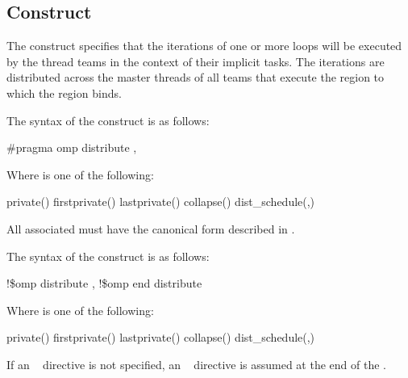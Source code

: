 {{{{\subsection{ Construct}
\label{subsec:distribute Construct}
\summary
The  construct specifies that the iterations of one or more loops will be 
executed by the thread teams in the context of their implicit tasks. The iterations are 
distributed across the master threads of all teams that execute the  region to 
which the  region binds.

\syntax
\ccppspecificstart
The syntax of the  construct is as follows:

\begin{boxedcode}
\#pragma omp distribute \plc{[clause[ [},\plc{] clause] ... ] new-line}
\end{boxedcode}

Where  is one of the following:

\begin{indentedcodelist}
private()
firstprivate()
lastprivate()
collapse()
dist\_schedule(\plc{kind[},\plc{ chunk\_size]})
\end{indentedcodelist}

All associated  must have the canonical form described in 
.
\ccppspecificend
\bigskip

\fortranspecificstart
The syntax of the  construct is as follows:

\begin{boxedcode}
!\$omp distribute \plc{[clause[ [},\plc{] clause] ... ]}
\plc{[}!\$omp end distribute\plc{]}
\end{boxedcode}

Where  is one of the following:

\begin{indentedcodelist}
private()
firstprivate()
lastprivate()
collapse()
dist\_schedule(\plc{kind[},\plc{ chunk\_size]})
\end{indentedcodelist}

If an ~ directive is not specified, an ~ directive 
is assumed at the end of the .

}}}}
